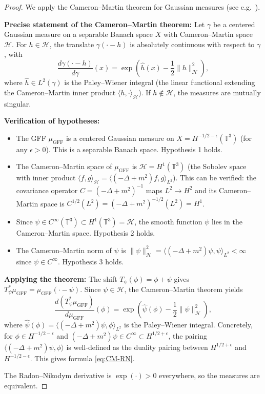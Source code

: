 \documentclass[12pt]{article}
\begin{document}
\begin{proof}
We apply the Cameron--Martin theorem for Gaussian measures (see e.g.\ \cite[Theorem 14.1]{DaPratoZabczyk}).

\textbf{Precise statement of the Cameron--Martin theorem:} Let $\gamma$ be a centered Gaussian measure on a separable Banach space $X$ with Cameron--Martin space $\mathcal{H}$. For $h \in \mathcal{H}$, the translate $\gamma(\cdot - h)$ is absolutely continuous with respect to $\gamma$, with
\[
\frac{d\gamma(\cdot - h)}{d\gamma}(x) = \exp\!\left(\hat{h}(x) - \frac{1}{2}\|h\|_{\mathcal{H}}^2\right),
\]
where $\hat{h} \in L^2(\gamma)$ is the Paley--Wiener integral (the linear functional extending the Cameron--Martin inner product $\langle h, \cdot\rangle_{\mathcal{H}}$). If $h \notin \mathcal{H}$, the measures are mutually singular.

\textbf{Verification of hypotheses:}
\begin{itemize}
\item The GFF $\mu_{\mathrm{GFF}}$ is a centered Gaussian measure on $X = H^{-1/2-\epsilon}(\mathbb{T}^3)$ (for any $\epsilon > 0$). This is a separable Banach space. Hypothesis 1 holds.
\item The Cameron--Martin space of $\mu_{\mathrm{GFF}}$ is $\mathcal{H} = H^1(\mathbb{T}^3)$ (the Sobolev space with inner product $\langle f, g\rangle_{\mathcal{H}} = \langle (-\Delta + m^2)f, g\rangle_{L^2}$). This can be verified: the covariance operator $C = (-\Delta + m^2)^{-1}$ maps $L^2 \to H^2$ and its Cameron--Martin space is $C^{1/2}(L^2) = (-\Delta + m^2)^{-1/2}(L^2) = H^1$.
\item Since $\psi \in C^\infty(\mathbb{T}^3) \subset H^1(\mathbb{T}^3) = \mathcal{H}$, the smooth function $\psi$ lies in the Cameron--Martin space. Hypothesis 2 holds.
\item The Cameron--Martin norm of $\psi$ is $\|\psi\|_{\mathcal{H}}^2 = \langle (-\Delta + m^2)\psi, \psi\rangle_{L^2} < \infty$ since $\psi \in C^\infty$. Hypothesis 3 holds.
\end{itemize}

\textbf{Applying the theorem:} The shift $T_\psi(\phi) = \phi + \psi$ gives $T_\psi^* \mu_{\mathrm{GFF}} = \mu_{\mathrm{GFF}}(\cdot - \psi)$. Since $\psi \in \mathcal{H}$, the Cameron--Martin theorem yields
\[
\frac{d(T_\psi^* \mu_{\mathrm{GFF}})}{d\mu_{\mathrm{GFF}}}(\phi) = \exp\!\left(\widehat{\psi}(\phi) - \frac{1}{2}\|\psi\|_{\mathcal{H}}^2\right),
\]
where $\widehat{\psi}(\phi) = \langle (-\Delta + m^2)\psi, \phi\rangle_{L^2}$ is the Paley--Wiener integral. Concretely, for $\phi \in H^{-1/2-\epsilon}$ and $(-\Delta + m^2)\psi \in C^\infty \subset H^{1/2+\epsilon}$, the pairing $\langle (-\Delta + m^2)\psi, \phi\rangle$ is well-defined as the duality pairing between $H^{1/2+\epsilon}$ and $H^{-1/2-\epsilon}$. This gives formula \eqref{eq:CM-RN}.

The Radon--Nikodym derivative is $\exp(\cdot) > 0$ everywhere, so the measures are equivalent.
\end{proof}
\end{document}
